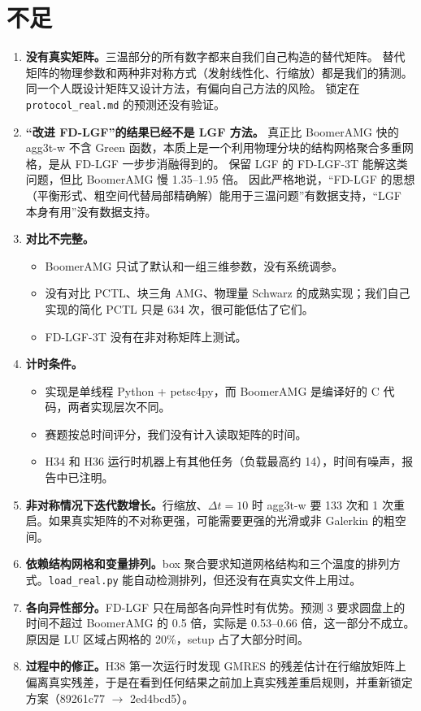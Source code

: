 \documentclass[11pt,a4paper]{ctexart}
\begin{document}
\section{不足}
\begin{enumerate}
\item \textbf{没有真实矩阵。}三温部分的所有数字都来自我们自己构造的替代矩阵。
替代矩阵的物理参数和两种非对称方式（发射线性化、行缩放）都是我们的猜测。
同一个人既设计矩阵又设计方法，有偏向自己方法的风险。
锁定在 \texttt{protocol\_real.md} 的预测还没有验证。
\item \textbf{“改进 FD-LGF”的结果已经不是 LGF 方法。}
真正比 BoomerAMG 快的 agg3t-w 不含 Green 函数，本质上是一个利用物理分块的结构网格聚合多重网格，是从 FD-LGF 一步步消融得到的。
保留 LGF 的 FD-LGF-3T 能解这类问题，但比 BoomerAMG 慢 1.35--1.95 倍。
因此严格地说，“FD-LGF 的思想（平衡形式、粗空间代替局部精确解）能用于三温问题”有数据支持，“LGF 本身有用”没有数据支持。
\item \textbf{对比不完整。}
\begin{itemize}
\item BoomerAMG 只试了默认和一组三维参数，没有系统调参。
\item 没有对比 PCTL、块三角 AMG、物理量 Schwarz 的成熟实现；我们自己实现的简化 PCTL 只是 634 次，很可能低估了它们。
\item FD-LGF-3T 没有在非对称矩阵上测试。
\end{itemize}
\item \textbf{计时条件。}
\begin{itemize}
\item 实现是单线程 Python + petsc4py，而 BoomerAMG 是编译好的 C 代码，两者实现层次不同。
\item 赛题按总时间评分，我们没有计入读取矩阵的时间。
\item H34 和 H36 运行时机器上有其他任务（负载最高约 14），时间有噪声，报告中已注明。
\end{itemize}
\item \textbf{非对称情况下迭代数增长。}行缩放、$\Delta t=10$ 时 agg3t-w 要 133 次和 1 次重启。如果真实矩阵的不对称更强，可能需要更强的光滑或非 Galerkin 的粗空间。
\item \textbf{依赖结构网格和变量排列。}box 聚合要求知道网格结构和三个温度的排列方式。\texttt{load\_real.py} 能自动检测排列，但还没有在真实文件上用过。
\item \textbf{各向异性部分。}FD-LGF 只在局部各向异性时有优势。预测 3 要求圆盘上的时间不超过 BoomerAMG 的 0.5 倍，实际是 0.53--0.66 倍，这一部分不成立。原因是 LU 区域占网格的 20\%，setup 占了大部分时间。
\item \textbf{过程中的修正。}H38 第一次运行时发现 GMRES 的残差估计在行缩放矩阵上偏离真实残差，于是在看到任何结果之前加上真实残差重启规则，并重新锁定方案（89261c77 $\to$ 2ed4bcd5）。
\end{enumerate}
\end{document}
